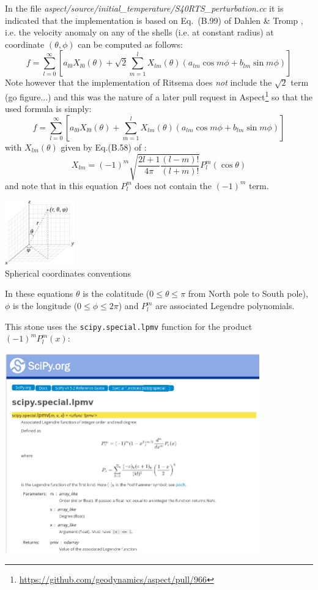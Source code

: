 In the file {\sl aspect/source/initial\_temperature/S40RTS\_perturbation.cc} it is 
indicated that the implementation is based on Eq.~(B.99) of Dahlen \& Tromp \cite{datr98}, 
i.e. the velocity anomaly on any of the shells 
(i.e. at constant radius) at coordinate $(\theta,\phi)$ can be computed as follows:
\[
f = \sum_{l=0}^\infty \left[a_{l0} X_{l0}(\theta) + \sqrt{2} \sum_{m=1}^l X_{lm}(\theta) 
\left(a_{lm} \cos m\phi + b_{lm} \sin m\phi \right) \right]
\]
Note however that the implementation of Ritsema does {\it not} include the $\sqrt{2}$ term (go figure...) and this 
was the nature of a later pull request in Aspect\footnote{\url{https://github.com/geodynamics/aspect/pull/966}} 
so that the used formula is simply:
\[
\boxed{
f = \sum_{l=0}^\infty \left[a_{l0} X_{l0}(\theta) + \sum_{m=1}^l X_{lm}(\theta) 
(a_{lm} \cos m\phi + b_{lm} \sin m\phi) \right]
}
\]
with $X_{lm}(\theta)$ given by Eq.(B.58) of  \cite{datr98}:
\[
\boxed{
X_{lm} = (-1)^m \sqrt{ \frac{2l+1}{4\pi} \frac{(l-m)!}{(l+m)!} } P_l^m(\cos\theta)
}
\]
and note that in this equation $P_l^m$ does not contain the $(-1)^m$ term.

\begin{center}
\includegraphics[width=3cm]{images/sphcoord}\\
{\captionfont Spherical coordinates conventions}
\end{center}

In these equations $\theta$ is the colatitude ($0\le\theta\le \pi$ from North pole to South pole), $\phi$
is the longitude ($0\le\phi\le 2\pi$) and $P_l^m$ are associated Legendre polynomials. 

This stone uses the {\tt scipy.special.lpmv} function for the product $(-1)^m P_l^m(x)$:
\begin{center}
\includegraphics[width=11cm]{python_codes/fieldstone_85/images/lpmv}
\end{center}

